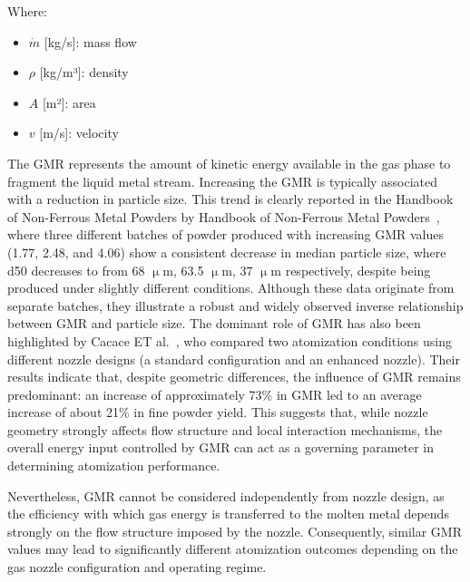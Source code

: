 \documentclass[../main]{subfiles}
\begin{document}
\vspace{0mm}
\begin{minipage}{\linewidth}
Where:
\begin{itemize}
    \item $\dot{m}$ [kg/s]: mass flow
    \item $\rho$ [kg/m³]: density
    \item $A$ [m²]: area
    \item $v$ [m/s]: velocity
\end{itemize}
\end{minipage}
\vspace{0mm}

The GMR represents the amount of kinetic energy available in the gas phase to fragment the liquid metal stream. Increasing the GMR is typically associated with a reduction in particle size. This trend is clearly reported in the Handbook of Non-Ferrous Metal Powders by Handbook of Non-Ferrous Metal Powders~\cite{Neikov2009HandbookNonFerrous}, where three different batches of powder produced with increasing GMR values (1.77, 2.48, and 4.06) show a consistent decrease in median particle size, where d50 decreases to from 68 $\upmu$m, 63.5 $\upmu$m, 37 $\upmu$m respectively, despite being produced under slightly different conditions. Although these data originate from separate batches, they illustrate a robust and widely observed inverse relationship between GMR and particle size.
The dominant role of GMR has also been highlighted by Cacace ET al.~\cite{Cacace2024InvestigationEffect}, who compared two atomization conditions using different nozzle designs (a standard configuration and an enhanced nozzle). Their results indicate that, despite geometric differences, the influence of GMR remains predominant: an increase of approximately 73\% in GMR led to an average increase of about 21\% in fine powder yield. This suggests that, while nozzle geometry strongly affects flow structure and local interaction mechanisms, the overall energy input controlled by GMR can act as a governing parameter in determining atomization performance.

Nevertheless, GMR cannot be considered independently from nozzle design, as the efficiency with which gas energy is transferred to the molten metal depends strongly on the flow structure imposed by the nozzle. Consequently, similar GMR values may lead to significantly different atomization outcomes depending on the gas nozzle configuration and operating regime.
\end{document}
